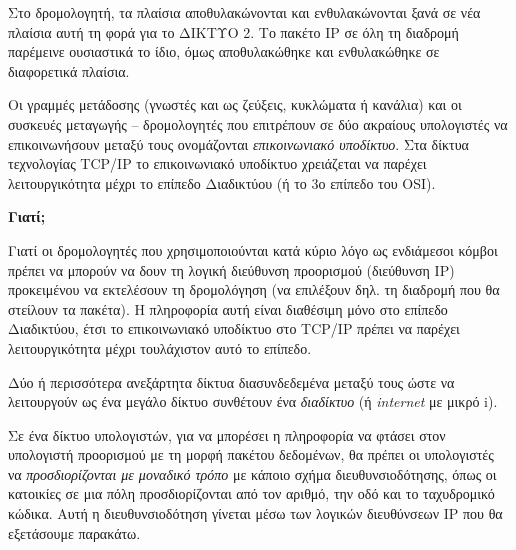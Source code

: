 Στο δρομολογητή, τα πλαίσια αποθυλακώνονται και ενθυλακώνονται ξανά σε νέα πλαίσια αυτή τη φορά για το ΔΙΚΤΥΟ 2.  Το πακέτο IP σε όλη τη διαδρομή παρέμεινε ουσιαστικά το ίδιο, όμως αποθυλακώθηκε και ενθυλακώθηκε σε διαφορετικά πλαίσια.

Οι γραμμές μετάδοσης (γνωστές και ως ζεύξεις, κυκλώματα ή κανάλια) και οι συσκευές μεταγωγής -- δρομολογητές που επιτρέπουν σε δύο ακραίους υπολογιστές να επικοινωνήσουν μεταξύ τους ονομάζονται \emph{επικοινωνιακό υποδίκτυο}. Στα δίκτυα τεχνολογίας TCP/IP το επικοινωνιακό υποδίκτυο χρειάζεται να παρέχει λειτουργικότητα μέχρι το επίπεδο Διαδικτύου (ή το 3ο επίπεδο του OSI).

\begin{inthebox}
\textbf{Γιατί;}

Γιατί οι δρομολογητές που χρησιμοποιούνται κατά κύριο λόγο ως ενδιάμεσοι κόμβοι πρέπει να μπορούν να δουν τη λογική διεύθυνση προορισμού (διεύθυνση IP) προκειμένου να εκτελέσουν τη δρομολόγηση (να επιλέξουν δηλ. τη διαδρομή που θα στείλουν τα πακέτα). Η πληροφορία αυτή είναι διαθέσιμη μόνο στο επίπεδο Διαδικτύου, έτσι το επικοινωνιακό υποδίκτυο στο TCP/IP πρέπει να παρέχει λειτουργικότητα μέχρι τουλάχιστον αυτό το επίπεδο.\\
\end{inthebox}

Δύο ή περισσότερα ανεξάρτητα δίκτυα διασυνδεδεμένα μεταξύ τους ώστε να λειτουργούν ως ένα μεγάλο δίκτυο συνθέτουν ένα \emph{διαδίκτυο} (ή \emph{internet} με μικρό i).

Σε ένα δίκτυο υπολογιστών, για να μπορέσει η πληροφορία να φτάσει στον υπολογιστή προορισμού με τη μορφή πακέτου δεδομένων, θα πρέπει οι υπολογιστές να  \emph{προσδιορίζονται με μοναδικό τρόπο} με κάποιο σχήμα διευθυνσιοδότησης, όπως οι κατοικίες σε μια πόλη προσδιορίζονται από τον αριθμό, την οδό και το ταχυδρομικό κώδικα. Αυτή η διευθυνσιοδότηση γίνεται μέσω των λογικών διευθύνσεων IP που θα εξετάσουμε παρακάτω.